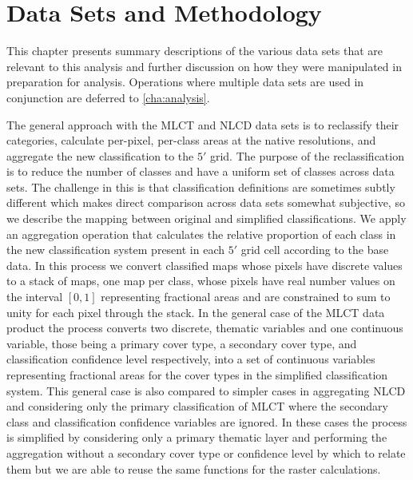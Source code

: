










\graphicspath{ {datasets/} }


\chapter{Data Sets and Methodology}
\label{cha:datasets}

This chapter presents summary descriptions of the various data sets
that are relevant to this analysis and further discussion on how they
were manipulated in preparation for analysis.  Operations where
multiple data sets are used in conjunction are deferred to
\autoref{cha:analysis}.

The general approach with the MLCT and NLCD data sets is to reclassify
their categories, calculate per-pixel, per-class areas at the native
resolutions, and aggregate the new classification to the $5'$ grid.
The purpose of the reclassification is to reduce the number of classes
and have a uniform set of classes across data sets.  The challenge in
this is that classification definitions are sometimes subtly different
which makes direct comparison across data sets somewhat subjective, so
we describe the mapping between original and simplified
classifications.  We apply an aggregation operation that calculates
the relative proportion of each class in the new classification system
present in each $5'$ grid cell according to the base data.  In this
process we convert classified maps whose pixels have discrete values
to a stack of maps, one map per class, whose pixels have real number
values on the interval $[0,1]$ representing fractional areas and are
constrained to sum to unity for each pixel through the stack.  In the
general case of the MLCT data product the process converts two
discrete, thematic variables and one continuous variable, those being
a primary cover type, a secondary cover type, and classification
confidence level respectively, into a set of continuous variables
representing fractional areas for the cover types in the simplified
classification system.  This general case is also compared to simpler
cases in aggregating NLCD and considering only the primary
classification of MLCT where the secondary class and classification
confidence variables are ignored.  In these cases the process is
simplified by considering only a primary thematic layer and performing
the aggregation without a secondary cover type or confidence level by
which to relate them but we are able to reuse the same functions for
the raster calculations.

